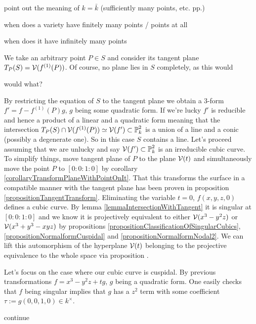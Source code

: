 \begin{todo}
\item point out the meaning of $k=\bar k$ (sufficiently many points, etc. pp.)
\item when does a variety have finitely many points / points at all
\item when does it have infinitely many points
\end{todo}
We take an arbitrary point $P \in S$ and consider its tangent plane $T_P(S) = \operatorname{\mathcal V}(f^{(1)}(P))$.
Of course, no plane lies in $S$ completely, as this would
\begin{todo} \item would what? \end{todo}
By restricting the equation of $S$ to the tangent plane we obtain a 3-form $f' = f - f^{(1)}(P)g$, $g$ being some quadratic form.
If we're lucky $f'$ is reducible and hence a product of a linear and a quadratic form meaning that the intersection $T_P(S) \cap \operatorname{\mathcal V}(f^{(1)}(P)) \simeq \operatorname{\mathcal V}(f') \subset \operatorname{\mathbb P}^2_k$ is a union of a line and a conic (possibly a degenerate one).
So in this case $S$ contains a line.
Let's proceed assuming that we are unlucky and say $\operatorname{\mathcal V}(f') \subset \operatorname{\mathbb P}^2_k$ is an irreducible cubic curve.
To simplify things, move tangent plane of $P$ to the plane $\operatorname{\mathcal V}(t)$ and simultaneously move the point $P$ to $[0:0:1:0]$ by corollary \ref{corollaryTransformPlaneWithPointOnIt}.
That this transforms the surface in a compatible manner with the tangent plane has been proven in proposition \ref{propositionTangentTransform}.
Eliminating the variable $t = 0$, $f(x,y,z,0)$ defines a cubic curve.
By lemma \ref{lemmaIntersectionWithTangent} it is singular at $[0:0:1:0]$ and we know it is projectively equivalent to either $\operatorname{\mathcal V}(x^3 - y^2z)$ or $\operatorname{\mathcal V}(x^3 + y^3 - xyz)$ by propositions \ref{propositionClassificationOfSingularCubics}, \ref{propositionNormalformCuspidal} and \ref{propositionNormalformNodal2}.
We can lift this automorphism of the hyperplane $\operatorname{\mathcal V}(t)$ belonging to the projective equivalence to the whole space via proposition \label{propositionLiftingAutomorphisms}.

Let's focus on the case where our cubic curve is cuspidal. By previous transformations $f = x^3 - y^2z + tg$, $g$ being a quadratic form.
One easily checks that $f$ being singular implies that $g$ has a $z^2$ term with some coefficient $\tau := g(0,0,1,0) \in k^\times$.





\begin{todo}
\item continue
\item \cite{sagemath2014}
\end{todo}

